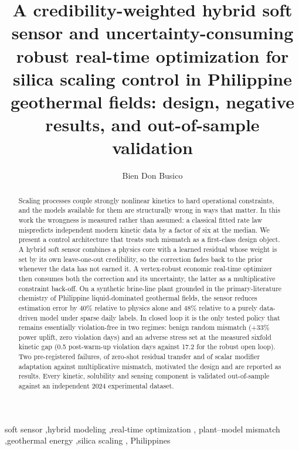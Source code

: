 \documentclass[review,number,sort&compress]{elsarticle}
\begin{document}
\begin{frontmatter}

\title{A credibility-weighted hybrid soft sensor and uncertainty-consuming
robust real-time optimization for silica scaling control in Philippine
geothermal fields: design, negative results, and out-of-sample
validation}

\author[upd]{Bien Don Busico}

\begin{abstract}
Scaling processes couple strongly nonlinear kinetics to hard operational
constraints, and the models available for them are structurally wrong in
ways that matter. In this work the wrongness is measured rather than
assumed: a classical fitted rate law mispredicts independent modern
kinetic data by a factor of six at the median. We present a control
architecture that treats such mismatch as a first-class design object.
A hybrid soft sensor combines a physics core with a learned residual
whose weight is set by its own leave-one-out credibility, so the
correction fades back to the prior whenever the data has not earned it.
A vertex-robust economic real-time optimizer then consumes both the
correction and its uncertainty, the latter as a multiplicative
constraint back-off. On a synthetic brine-line plant grounded in the
primary-literature chemistry of Philippine liquid-dominated geothermal
fields, the sensor reduces estimation error by 40\% relative to physics
alone and 48\% relative to a purely data-driven model under sparse
daily labels. In closed loop it is the only tested policy that remains
essentially violation-free in two regimes: benign random mismatch
(+33\% power uplift, zero violation days) and an adverse stress set at
the measured sixfold kinetic gap (0.5 post-warm-up violation days
against 17.2 for the robust open loop). Two pre-registered failures,
of zero-shot residual transfer and of scalar modifier adaptation
against multiplicative mismatch, motivated the design and are reported
as results. Every kinetic, solubility and sensing component is
validated out-of-sample against an independent 2024 experimental
dataset.

\end{abstract}

\begin{keyword}
soft sensor \sep hybrid modeling \sep real-time optimization \sep
plant--model mismatch \sep geothermal energy \sep silica scaling \sep
Philippines
\end{keyword}

\end{frontmatter}
\end{document}
